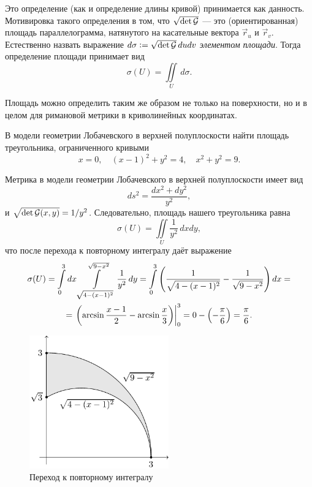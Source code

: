 Это определение (как и определение длины кривой) принимается как данность. Мотивировка такого определения в том, что $\sqrt{\det\mathcal{G}}$ --- это (ориентированная) площадь параллелограмма, натянутого на касательные вектора $\vec{r}_u$ и $\vec{r}_v$. Естественно назвать выражение $d\sigma \vcentcolon = \sqrt{\det\mathcal{G}}\,dudv$ \textit{элементом площади}. Тогда определение площади принимает вид
\[
	\sigma(U) = \iint\limits_{U}\,d\sigma.
\]

Площадь можно определить таким же образом не только на поверхности, но и в целом для римановой метрики в криволинейных координатах.

\begin{problem}
	В модели геометрии Лобачевского в верхней полуплоскости найти площадь треугольника, ограниченного кривыми
	\[
		x = 0,\quad (x - 1)^2 + y^2 = 4,\quad x^2 + y^2 = 9.
	\]
\end{problem}

\begin{solution}
	Метрика в модели геометрии Лобачевского в верхней полуплоскости имеет вид
	\[
		ds^2 = \frac{dx^2 + dy^2}{y^2},
	\]
	и $\sqrt{\det\mathcal{G}(x, y)} = 1 / y^2$. Следовательно, площадь нашего треугольника равна
	\[
		\sigma(U) = \iint\limits_{U}\frac{1}{y^2}\,dxdy,
	\]
	что после перехода к повторному интегралу даёт выражение
	\begin{multline*}
		\sigma(U) = \int\limits_0^3 dx\int\limits_{\sqrt{4 - (x - 1)^2}}^{\sqrt{9 - x^2}}\frac{1}{y^2}\,dy = \int\limits_0^3\left(\frac{1}{\sqrt{4 - (x - 1)^2}} - \frac{1}{\sqrt{9 - x^2}}\right)dx =\\ = \left.\left(\arcsin\frac{x - 1}{2} - \arcsin\frac{x}{3}\right)\right|_0^3 = 0 - \left(-\frac{\pi}{6}\right) = \frac{\pi}{6}.
	\end{multline*}

	\begin{figure}[H]
		\centering
		\includegraphics[width=6cm]{./img/CurveTriangle.pdf}
		\caption{Переход к повторному интегралу}
	\end{figure}
\end{solution}

